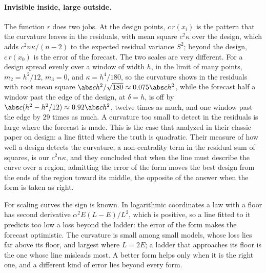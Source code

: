 \begin{refsection}
\paragraph{Invisible inside, large outside.} The function $r$ does two jobs. At the design points, $c\,r(x_i)$ is the pattern that the curvature leaves in the residuals, with mean square $c^2\kappa$ over the design, which adds $c^2n\kappa/(n-2)$ to the expected residual variance $S^2$; beyond the design, $c\,r(x_0)$ is the error of the forecast. The two scales are very different. For a design spread evenly over a window of width $h$, in the limit of many points, $m_2=h^2/12$, $m_3=0$, and $\kappa=h^4/180$, so the curvature shows in the residuals with root mean square $\abs c h^2/\sqrt{180}\approx0.075\abs c h^2$, while the forecast half a window past the edge of the design, at $\delta=h$, is off by $\abs c(h^2-h^2/12)\approx0.92\abs c h^2$, twelve times as much, and one window past the edge by 29 times as much. A curvature too small to detect in the residuals is large where the forecast is made. This is the case that \textcite{BoxDraper1959} analyzed in their classic paper on design: a line fitted where the truth is quadratic. Their measure of how well a design detects the curvature, a non-centrality term in the residual sum of squares, is our $c^2n\kappa$, and they concluded that when the line must describe the curve over a region, admitting the error of the form moves the best design from the ends of the region toward its middle, the opposite of the answer when the form is taken as right.

For scaling curves the sign is known. In logarithmic coordinates a law with a floor has second derivative $\alpha^2E(L-E)/L^2$, which is positive, so a line fitted to it predicts too low a loss beyond the ladder: the error of the form makes the forecast optimistic. The curvature is small among small models, whose loss lies far above its floor, and largest where $L=2E$; a ladder that approaches its floor is the one whose line misleads most. A better form helps only when it is the right one, and a different kind of error lies beyond every form.


\end{refsection}
